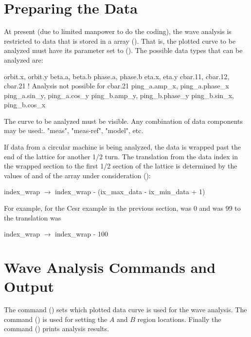 \section{Preparing the Data} 
\label{s:wave.data}

At present (due to limited manpower to do the coding), the wave analysis is restricted to data that
is stored in a  array (). That is, the plotted curve to be analyzed must
have its  parameter set to  (). The possible data types
that can be analyzed are:
\begin{example}
  orbit.x, orbit.y
  beta.a,  beta.b
  phase.a, phase.b
  eta.x, eta.y
  cbar.11, cbar.12, cbar.21      ! Analysis not possible for cbar.21
  ping_a.amp_x, ping_a.phase_x
  ping_a.sin_y, ping_a.cos_y
  ping_b.amp_y, ping_b.phase_y
  ping_b.sin_x, ping_b.cos_x
\end{example}
The curve to be analyzed must be visible. Any combination of data components may be used:. "meas",
"meas-ref", "model", etc.

If data from a circular machine is being analyzed, the data is wrapped past the end of the lattice
for another 1/2 turn. The translation from the data index in the wrapped section to the first 1/2
section of the lattice is determined by the values of  and  of the
 array under consideration ():
\begin{example}
  index_wrap \(\longrightarrow\) index_wrap - (ix_max_data - ix_min_data + 1)
\end{example}
For example, for the Cesr example in the previous section,  was 0 and
 was 99 to the translation was
\begin{example}
  index_wrap \(\longrightarrow\) index_wrap - 100
\end{example}

\section{Wave Analysis Commands and Output}
\label{s:wave.cmd.out}

The  command () sets which plotted data curve is used for the wave
analysis. The  command () is used for setting the $A$ and $B$ region
locations. Finally the  command () prints analysis results.

